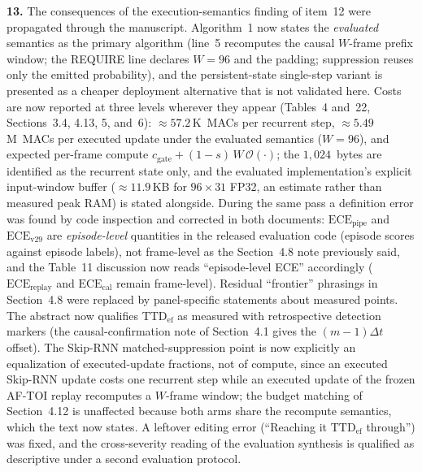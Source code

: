 \documentclass[1p,12pt,authoryear]{elsarticle}
\begin{document}
\vspace{2mm}
\noindent \textbf{13.} The consequences of the execution-semantics finding of item~12 were propagated through the manuscript. Algorithm~1 now states the \emph{evaluated} semantics as the primary algorithm (line~5 recomputes the causal $W$-frame prefix window; the REQUIRE line declares $W{=}96$ and the padding; suppression reuses only the emitted probability), and the persistent-state single-step variant is presented as a cheaper deployment alternative that is not validated here. Costs are now reported at three levels wherever they appear (Tables~4 and~22, Sections~3.4, 4.13, 5, and~6): ${\approx}57.2$\,K~MACs per recurrent step, ${\approx}5.49$\,M~MACs per executed update under the evaluated semantics ($W{=}96$), and expected per-frame compute $c_{\mathrm{gate}}+(1-s)\,W\,\mathcal{O}(\cdot)$; the $1{,}024$~bytes are identified as the recurrent state only, and the evaluated implementation's explicit input-window buffer (${\approx}11.9$\,KB for $96\times31$ FP32, an estimate rather than measured peak RAM) is stated alongside. During the same pass a definition error was found by code inspection and corrected in both documents: $\mathrm{ECE}_{\mathrm{pipe}}$ and $\mathrm{ECE}_{\mathrm{v29}}$ are \emph{episode-level} quantities in the released evaluation code (episode scores against episode labels), not frame-level as the Section~4.8 note previously said, and the Table~11 discussion now reads ``episode-level ECE'' accordingly ($\mathrm{ECE}_{\mathrm{replay}}$ and $\mathrm{ECE}_{\mathrm{cal}}$ remain frame-level). Residual ``frontier'' phrasings in Section~4.8 were replaced by panel-specific statements about measured points. The abstract now qualifies $\mathrm{TTD}_{\mathrm{ef}}$ as measured with retrospective detection markers (the causal-confirmation note of Section~4.1 gives the $(m{-}1)\Delta t$ offset). The Skip-RNN matched-suppression point is now explicitly an equalization of executed-update fractions, not of compute, since an executed Skip-RNN update costs one recurrent step while an executed update of the frozen AF-TOI replay recomputes a $W$-frame window; the budget matching of Section~4.12 is unaffected because both arms share the recompute semantics, which the text now states. A leftover editing error (``Reaching it $\mathrm{TTD}_{\mathrm{ef}}$ through'') was fixed, and the cross-severity reading of the evaluation synthesis is qualified as descriptive under a second evaluation protocol.
\end{document}
